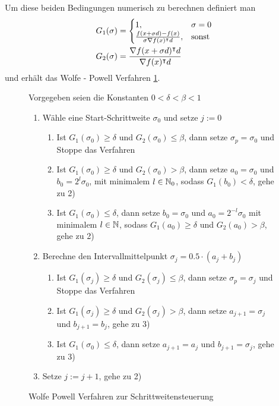 Um diese beiden Bedingungen numerisch zu berechnen definiert man
\begin{equation}
\begin{aligned}
 G_1(\sigma)&=
 \begin{cases}
 1,& \sigma=0\\
 \frac{f(x+\sigma d)-f(x)}{\sigma \nabla f(x)^\intercal d}, & \text{sonst}
 \end{cases} \\
 G_2(\sigma) &= \frac{\nabla f(x+\sigma d)^\intercal d}{\nabla f(x)^\intercal d}
 \end{aligned}
\end{equation}
und erhält das Wolfe - Powell Verfahren \ref{alg:wolfePowell}.

\begin{figure}
\label{alg:wolfePowell}
\begin{framed}
Vorgegeben seien die Konstanten $0<\delta<\beta<1$
 \begin{enumerate}
  \item Wähle eine Start-Schrittweite $\sigma_0$ und setze $j:=0$
  \begin{enumerate}
   \item Ist $G_1(\sigma_0)\geq \delta$ und $G_2(\sigma_0)\leq \beta$, dann setze $\sigma_p=\sigma_0$ und Stoppe das Verfahren
   \item Ist $G_1(\sigma_0)\geq \delta$ und $G_2(\sigma_0)> \beta$, dann setze $a_0=\sigma_0$ und $b_0=2^l\sigma_0$, mit minimalem $l\in \mathbb{N}_0$, sodass $G_1(b_0)<\delta$, gehe zu 2)
   \item Ist $G_1(\sigma_0)\leq \delta$, dann setze $b_0=\sigma_0$ und $a_0=2^{-l}\sigma_0$ mit minimalem $l\in \mathbb{N}$, sodass $G_1(a_0)\geq\delta$ und $G_2(a_0)>\beta$, gehe zu 2)
  \end{enumerate}
  \item Berechne den Intervallmittelpunkt $\sigma_j = 0.5\cdot (a_j+b_j)$
  \begin{enumerate}
    \item Ist $G_1(\sigma_j)\geq \delta$ und $G_2(\sigma_j)\leq \beta$, dann setze $\sigma_p=\sigma_j$ und Stoppe das Verfahren
    \item Ist $G_1(\sigma_j)\geq \delta$ und $G_2(\sigma_j)> \beta$, dann setze $a_{j+1}=\sigma_j$ und $b_{j+1}=b_j$, gehe zu 3)
    \item Ist $G_1(\sigma_0)\leq \delta$, dann setze $a_{j+1}=a_j$ und $b_{j+1}=\sigma_j$, gehe zu 3)
  \end{enumerate}
  \item Setze $j:=j+1$, gehe zu 2)
 \end{enumerate}
\end{framed}
\caption{Wolfe Powell Verfahren zur Schrittweitensteuerung}
\end{figure}

